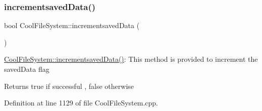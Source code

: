 \subsubsection{\texorpdfstring{incrementsaved\+Data()}{incrementsavedData()}}
{\footnotesize\ttfamily bool Cool\+File\+System\+::incrementsaved\+Data (\begin{DoxyParamCaption}{ }\end{DoxyParamCaption})}

\hyperlink{class_cool_file_system_aae045125288f255f3e258073dcada2a6}{Cool\+File\+System\+::incrementsaved\+Data()}\+: This method is provided to increment the saved\+Data flag

\begin{DoxyReturn}{Returns}
true if successful , false otherwise 
\end{DoxyReturn}


Definition at line 1129 of file Cool\+File\+System.\+cpp.


